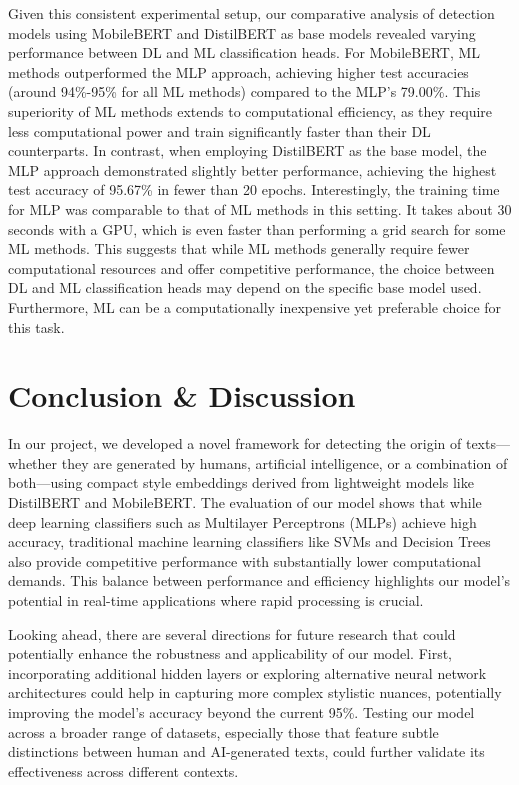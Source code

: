 \documentclass{article}
\begin{document}
Given this consistent experimental setup, our comparative analysis of detection models using MobileBERT and DistilBERT as base models revealed varying performance between DL and ML classification heads. For MobileBERT, ML methods outperformed the MLP approach, achieving higher test accuracies (around 94\%-95\% for all ML methods) compared to the MLP's 79.00\%. This superiority of ML methods extends to computational efficiency, as they require less computational power and train significantly faster than their DL counterparts. In contrast, when employing DistilBERT as the base model, the MLP approach demonstrated slightly better performance, achieving the highest test accuracy of 95.67\% in fewer than 20 epochs. Interestingly, the training time for MLP was comparable to that of ML methods in this setting. It takes about 30 seconds with a GPU, which is even faster than performing a grid search for some ML methods. This suggests that while ML methods generally require fewer computational resources and offer competitive performance, the choice between DL and ML classification heads may depend on the specific base model used. Furthermore, ML can be a computationally inexpensive yet preferable choice for this task.

\section{Conclusion \& Discussion}

In our project, we developed a novel framework for detecting the origin of texts---whether they are generated by humans, artificial intelligence, or a combination of both---using compact style embeddings derived from lightweight models like DistilBERT and MobileBERT. The evaluation of our model shows that while deep learning classifiers such as Multilayer Perceptrons (MLPs) achieve high accuracy, traditional machine learning classifiers like SVMs and Decision Trees also provide competitive performance with substantially lower computational demands. This balance between performance and efficiency highlights our model's potential in real-time applications where rapid processing is crucial.

Looking ahead, there are several directions for future research that could potentially enhance the robustness and applicability of our model. First, incorporating additional hidden layers or exploring alternative neural network architectures could help in capturing more complex stylistic nuances, potentially improving the model’s accuracy beyond the current 95\%. Testing our model across a broader range of datasets, especially those that feature subtle distinctions between human and AI-generated texts, could further validate its effectiveness across different contexts.
\end{document}
